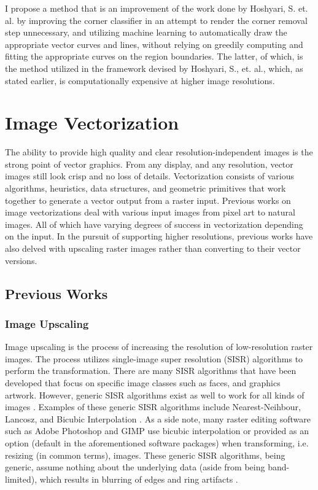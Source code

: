 \documentclass[12pt]{article}
\begin{document}
I propose a method that is an improvement of the work done by Hoshyari, S. et. al. by improving the corner classifier in an attempt to render the corner removal step unnecessary, and utilizing machine learning to automatically draw the appropriate vector curves and lines, without relying on greedily computing and fitting the appropriate curves on the region boundaries. The latter, of which, is the method utilized in the framework devised by Hoshyari, S., et. al., which, as stated earlier, is computationally expensive at higher image resolutions.

\section{Image Vectorization}
The ability to provide high quality and clear resolution-independent images is the strong point of vector graphics. From any display, and any resolution, vector images still look crisp and no loss of details. Vectorization consists of various algorithms, heuristics, data structures, and geometric primitives that work together to generate a vector output from a raster input. Previous works on image vectorizations deal with various input images from pixel art to natural images. All of which have varying degrees of success in vectorization depending on the input. In the pursuit of supporting higher resolutions, previous works have also delved with upscaling raster images rather than converting to their vector versions.

\subsection{Previous Works}
\subsubsection{Image Upscaling}
Image upscaling is the process of increasing the resolution of low-resolution raster images. The process utilizes single-image super resolution (SISR) algorithms to perform the transformation. There are many SISR algorithms that have been developed that focus on specific image classes such as faces, and graphics artwork. However, generic SISR algorithms exist as well to work for all kinds of images \cite{SISRBenchmark}. Examples of these generic SISR algorithms include Nearest-Neihbour, Lancosz, and Bicubic Interpolation \cite{DepixelizingPixelArt}. As a side note, many raster editing software such as Adobe Photoshop and GIMP use bicubic interpolation or provided as an option (default in the aforementioned software packages) when transforming, i.e. resizing (in common terms), images. These generic SISR algorithms, being generic, assume nothing about the underlying data (aside from being band-limited), which results in blurring of edges and ring artifacts \cite{DepixelizingPixelArt}.
\end{document}
